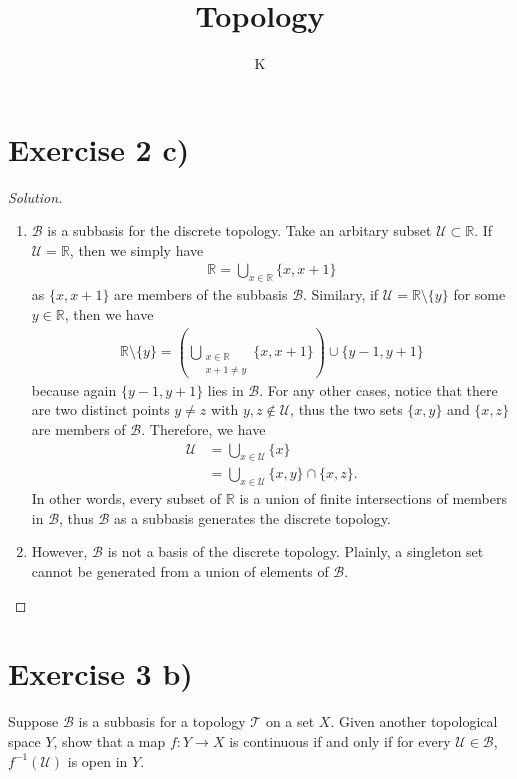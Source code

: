 \documentclass[a4paper]{article}
\title{Topology}
\author{K}
\theoremstyle{definition}
\begin{document}
\section*{Exercise 2 c)}

\begin{proof}[Solution]
    \begin{enumerate}
        \item \(\mathcal{B}\) is a subbasis for the discrete topology. Take an arbitary subset \(\mathcal{U} \subset \mathbb{R}\). If \(\mathcal{U} = \mathbb{R}\), then we simply have
        \begin{align*}
            \mathbb{R} = \bigcup_{x \in \mathbb{R}} \{x, x + 1\}
        \end{align*}
        as \(\{x, x + 1\}\) are members of the subbasis \(\mathcal{B}\). Similary, if \(\mathcal{U} = \mathbb{R} \setminus \{y\}\) for some \(y \in \mathbb{R}\), then we have
        \begin{align*}
            \mathbb{R} \setminus \{y\} = \left( \bigcup_{\substack{x \in \mathbb{R} \\ x + 1 \neq y}} \{x, x + 1\} \right) \cup \{y - 1, y + 1\}
        \end{align*}
        because again \(\{y - 1, y + 1\}\) lies in \(\mathcal{B}\). For any other cases, notice that there are two distinct points \(y \neq z\) with \(y, z \not\in \mathcal{U}\), thus the two sets \(\{x, y\}\) and \(\{x, z\}\) are members of \(\mathcal{B}\). Therefore, we have
        \begin{align*}
            \mathcal{U} &= \bigcup_{x \in \mathcal{U}} \{x\} \\
            &= \bigcup_{x \in \mathcal{U}} \{x, y\} \cap \{x, z\} \text{.}
        \end{align*}
        In other words, every subset of \(\mathbb{R}\) is a union of finite intersections of members in \(\mathcal{B}\), thus \(\mathcal{B}\) as a subbasis generates the discrete topology.
        \item However, \(\mathcal{B}\) is not a basis of the discrete topology. Plainly, a singleton set cannot be generated from a union of elements of \(\mathcal{B}\).
    \end{enumerate}
\end{proof}

\section*{Exercise 3 b)}
Suppose \(\mathcal{B}\) is a subbasis for a topology \(\mathcal{T}\) on a set \(X\). Given another topological space \(Y\), show that a map \(f: Y \longrightarrow X\) is continuous if and only if for every \(\mathcal{U} \in \mathcal{B}\), \(f^{-1}(\mathcal{U})\) is open in \(Y\).
\end{document}

